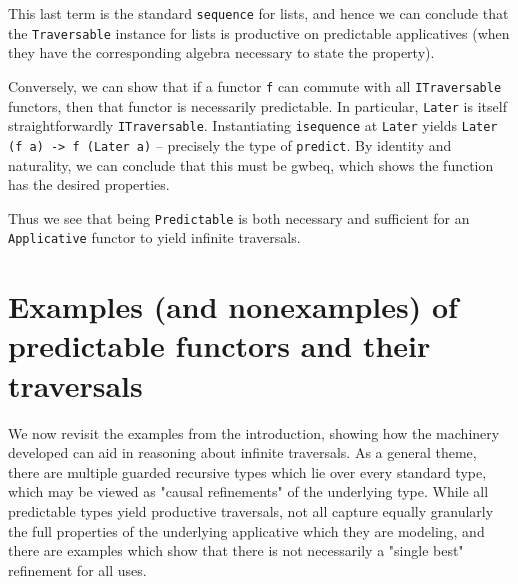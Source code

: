 \documentclass[hoptionsi,review,format=sigplan]{acmart}
\newenvironment{code}
 {\VerbatimEnvironment
  \begin{verbatim}}
 {\end{verbatim}}
\newcommand{\hs}{\texttt}
\begin{document}
This last term is the standard \hs{sequence} for lists, and hence we can conclude that the \hs{Traversable} instance for lists is productive on predictable applicatives (when they have the corresponding algebra necessary to state the property).

Conversely, we can show that if a functor \hs{f} can commute with all \hs{ITraversable} functors, then that functor is necessarily predictable. In particular, \hs{Later} is itself straightforwardly \hs{ITraversable}. Instantiating \hs{isequence} at \hs{Later} yields \hs{Later (f a) -> f (Later a)} -- precisely the type of \hs{predict}. By identity and naturality, we can conclude that this must be gwbeq, which shows the function has the desired properties.

Thus we see that being \hs{Predictable} is both necessary and sufficient for an \hs{Applicative} functor to yield infinite traversals.


\section{Examples (and nonexamples) of predictable functors and their traversals}

\begin{comment}
\begin{code}

class Contravariant f where
  contramap :: (a -> b) -> f b -> f a

instance Semigroup w => Semigroup (Delay w) where
  Now x <> Now y = Now (x <> y)
  x <> Wait y = Wait $ fmap (x <>) y
  Wait x <> y = Wait (fmap (<> y) x)

instance Monoid w => Monoid (Delay w) where
  mempty = Now mempty
  
\end{code}
\end{comment}

We now revisit the examples from the introduction, showing how the machinery developed can aid in reasoning about infinite traversals. As a general theme, there are multiple guarded recursive types which lie over every standard type, which may be viewed as "causal refinements" of the underlying type. While all predictable types yield productive traversals, not all capture equally granularly the full properties of the underlying applicative which they are modeling, and there are examples which show that there is not necessarily a "single best" refinement for all uses.
\end{document}
